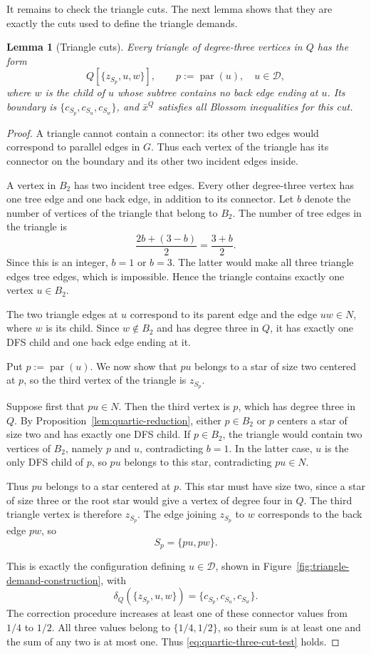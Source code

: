 \documentclass[11pt]{amsart}
\newcommand{\1}{\mathbbm{1}}
\newtheorem{lemma}[theorem]{Lemma}
\begin{document}
It remains to check the triangle cuts.
The next lemma shows that they are exactly the cuts
used to define the triangle demands.

\begin{lemma}[Triangle cuts]
\label{lem:quartic-triangles}
Every triangle of degree-three vertices in $Q$ has the form
\[
 Q[\{z_{S_p},u,w\}],
 \qquad p:=\operatorname{par}(u),\quad u\in\mathcal D,
\]
where $w$ is the child of $u$ whose subtree contains no
back edge ending at $u$.
Its boundary is $\{c_{S_p},c_{S_u},c_{S_w}\}$, and $\bar x^Q$ satisfies
all Blossom inequalities for this cut.
\end{lemma}

\begin{proof}
A triangle cannot contain a connector: its other two
edges would correspond to parallel edges in $G$.
Thus each vertex of the triangle has its connector
on the boundary and its other two incident edges inside.

A vertex in $B_2$ has two incident tree edges.
Every other degree-three vertex has one tree edge and
one back edge, in addition to its connector.
Let $b$ denote the number of vertices of the triangle that
belong to $B_2$. The number of tree edges in the triangle is
\[
 \frac{2b+(3-b)}2=\frac{3+b}{2}.
\]
Since this is an integer, $b=1$ or $b=3$.
The latter would make all three triangle edges tree edges,
which is impossible. Hence the triangle contains exactly
one vertex $u\in B_2$.

The two triangle edges at $u$ correspond to its parent
edge and the edge $uw\in N$, where $w$ is its child.
Since $w\notin B_2$ and has degree three in $Q$, it has
exactly one DFS child and one back edge ending at it.

Put $p:=\operatorname{par}(u)$. We now show that $pu$ belongs
to a star of size two centered at $p$, so the third vertex of the
triangle is $z_{S_p}$.

Suppose first that $pu\in N$. Then the third vertex is $p$,
which has degree three in $Q$. By
Proposition~\ref{lem:quartic-reduction}, either $p\in B_2$
or $p$ centers a star of size two and has exactly one DFS child.
If $p\in B_2$, the triangle would contain two vertices
of $B_2$, namely $p$ and $u$, contradicting $b=1$.
In the latter case, $u$ is the only DFS child of $p$, so $pu$
belongs to this star, contradicting $pu\in N$.

Thus $pu$ belongs to a star centered at $p$. This star must
have size two, since a star of size three or the root star would give a
vertex of degree four in $Q$. The third triangle vertex
is therefore $z_{S_p}$. The edge joining $z_{S_p}$ to $w$
corresponds to the back edge $pw$, so
\[
 S_p=\{pu,pw\}.
\]

This is exactly the configuration defining $u\in\mathcal D$,
shown in Figure~\ref{fig:triangle-demand-construction}, with
\[
 \delta_Q(\{z_{S_p},u,w\})
 =\{c_{S_p},c_{S_u},c_{S_w}\}.
\]
The correction procedure increases at least one of these
connector values from $1/4$ to $1/2$.
All three values belong to $\{1/4,1/2\}$, so their sum is
at least one and the sum of any two is at most one.
Thus \eqref{eq:quartic-three-cut-test} holds.
\end{proof}
\end{document}

